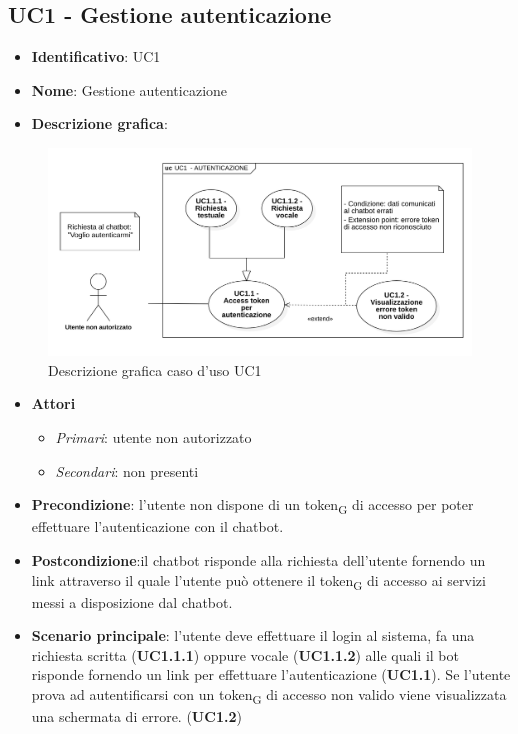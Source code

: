 \subsection{UC1 - Gestione autenticazione}
\begin{itemize}
    \item \textbf{Identificativo}: UC1
    \item \textbf{Nome}: Gestione autenticazione
    \item \textbf{Descrizione grafica}:
\end{itemize}

\begin{figure}[h]
    \includegraphics[scale=0.50]{images/UC1.png} 
    \caption{Descrizione grafica caso d'uso UC1}
\end{figure}

 \begin{itemize}
    \item \textbf{Attori}
 \begin{itemize} 
    \item \textit{Primari}: utente non autorizzato
    \item \textit{Secondari}: non presenti
 \end{itemize}
 \item \textbf{Precondizione}: l'utente non dispone di un token\textsubscript{G} di accesso per poter effettuare l'autenticazione con il chatbot.
 \item \textbf{Postcondizione}:il chatbot risponde alla richiesta dell'utente fornendo un link attraverso il quale l'utente può ottenere il token\textsubscript{G} di accesso ai servizi messi a disposizione dal chatbot.
 \item \textbf{Scenario principale}: l'utente deve effettuare il login al sistema, fa una richiesta scritta (\textbf{UC1.1.1}) oppure vocale (\textbf{UC1.1.2}) alle quali il bot risponde fornendo un link per effettuare l'autenticazione (\textbf{UC1.1}). Se l'utente prova ad autentificarsi con un token\textsubscript{G} di accesso non valido viene visualizzata una schermata di errore. (\textbf{UC1.2})
\end{itemize}
\newpage

